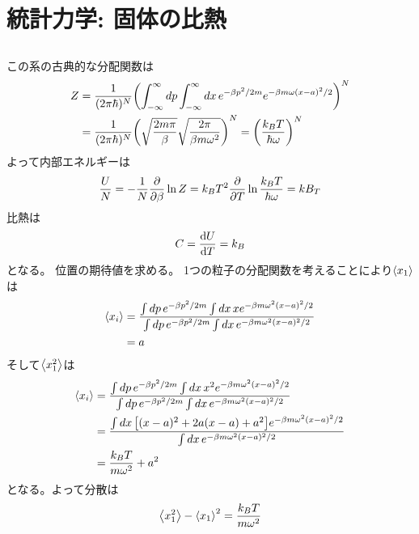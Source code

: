 \documentclass[../../sp_2015.tex]{subfiles}
\begin{document}
\section{統計力学: 固体の比熱}
\subsection{}
この系の古典的な分配関数は
\begin{equation}\begin{aligned}[b]
    Z &= \frac{1}{(2\pi\hbar)^N}\qty(\int_{-\infty}^{\infty}dp\int_{-\infty}^{\infty}dx\,e^{-\beta p^2/2m}e^{-\beta m\omega(x-a)^2/2})^N\\
    &= \frac{1}{(2\pi\hbar)^N}\qty(\sqrt{\frac{2m\pi}{\beta}}\sqrt{\frac{2\pi}{\beta m\omega^2}})^N
    =\qty(\frac{k_BT}{\hbar\omega})^N
\end{aligned}\end{equation}
よって内部エネルギーは
\begin{equation}\begin{aligned}[b]
    \frac{U}{N}=-\frac{1}{N}\pdv{\beta}\ln Z = k_BT^2\pdv{T}\ln\frac{k_BT}{\hbar\omega} = kB_T
\end{aligned}\end{equation}
比熱は
\begin{equation}\begin{aligned}[b]
    C = \dv{U}{T}=k_B
\end{aligned}\end{equation}
となる。
位置の期待値を求める。
1つの粒子の分配関数を考えることにより\(\ev{x_1}\)は
\begin{equation}\begin{aligned}[b]
    \ev{x_i} &= \frac{\int dp\,e^{-\beta p^2/2m}\int dx\, xe^{-\beta m\omega^2(x-a)^2/2}}{\int dp\,e^{-\beta p^2/2m}\int dx\, e^{-\beta m\omega^2(x-a)^2/2}}\\
    &= a
\end{aligned}\end{equation}
そして\(\ev{x_1^2}\)は
\begin{equation}\begin{aligned}[b]
    \ev{x_i} &= \frac{\int dp\,e^{-\beta p^2/2m}\int dx\, x^2e^{-\beta m\omega^2(x-a)^2/2}}{\int dp\,e^{-\beta p^2/2m}\int dx\, e^{-\beta m\omega^2(x-a)^2/2}}\\
    &= \frac{\int dx\, \qty[(x-a)^2+2a(x-a)+a^2]e^{-\beta m\omega^2(x-a)^2/2}}{\int dx\, e^{-\beta m\omega^2(x-a)^2/2}}\\
    &= \frac{k_BT}{m\omega^2}+a^2
\end{aligned}\end{equation}
となる。よって分散は
\begin{equation}\begin{aligned}[b]
    \ev{x_1^2}-\ev{x_1}^2=\frac{k_BT}{m\omega^2}
\end{aligned}\end{equation}
\end{document}
